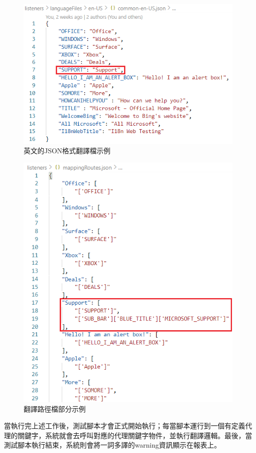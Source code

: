 \begin{figure}[H]
    \centering
    \includegraphics[width= .7\textwidth]{../論文截圖/3-1-3-2 JSON格式翻譯檔.png}
    \caption{英文的JSON格式翻譯檔示例}
    \label{英文的JSON格式翻譯檔示例}
\end{figure}

\begin{figure}[H]
    \centering
    \includegraphics[width= .7\textwidth]{../論文截圖/3-1-3-3 翻譯路徑檔.png}
    \caption{翻譯路徑檔部分示例}
    \label{翻譯路徑檔}
\end{figure}
當執行完上述工作後，測試腳本才會正式開始執行；每當腳本運行到一個有定義代理的關鍵字，系統就會去呼叫對應的代理關鍵字物件，並執行翻譯邏輯。最後，當測試腳本執行結束，系統則會將一詞多譯的warning資訊顯示在報表上。

\hspace*{\fill} \\
\\ \hspace*{\fill} \\
\\ \hspace*{\fill} \\
